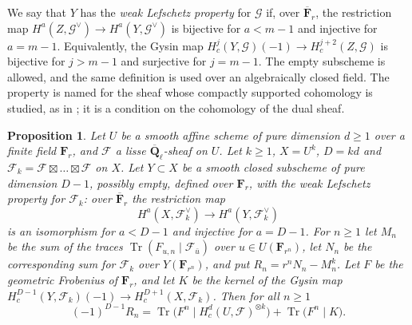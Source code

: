 \documentclass[11pt,a4paper]{article}
\theoremstyle{plain}
\newtheorem{proposition}[theorem]{Proposition}
\theoremstyle{remark}
\newcommand{\Ql}{\overline{\mathbf Q}_\ell}
\newcommand{\F}{\mathcal F}
\newcommand{\G}{\mathcal G}
\newcommand{\Tr}{\operatorname{Tr}}
\begin{document}
We say that $Y$ has the \emph{weak Lefschetz property} for $\G$ if, over $\overline{\mathbf F}_r$, the restriction
map $H^a(Z,\G^\vee)\to H^a(Y,\G^\vee)$ is bijective for $a<m-1$ and injective for $a=m-1$. Equivalently, the Gysin
map $H^j_c(Y,\G)(-1)\to H^{j+2}_c(Z,\G)$ is bijective for $j>m-1$ and surjective for $j=m-1$. The empty subscheme
is allowed, and the same definition is used over an algebraically closed field. The property is named for the
sheaf whose compactly supported cohomology is studied, as in \cite[Definition 2.3]{Zhang}; it is a condition on
the cohomology of the dual sheaf.

\begin{proposition}\label{prop:remainder}
Let $U$ be a smooth affine scheme of pure dimension $d\ge1$ over a finite field $\mathbf F_r$, and $\F$ a lisse
$\Ql$-sheaf on $U$. Let $k\ge1$, $X=U^k$, $D=kd$ and $\F_k=\F\boxtimes\dots\boxtimes\F$ on $X$. Let $Y\subset X$ be a
smooth closed subscheme of pure dimension $D-1$, possibly empty, defined over $\mathbf F_r$, with the weak Lefschetz
property for $\F_k$: over $\overline{\mathbf F}_r$ the restriction map
\[
H^a(X,\F_k^\vee)\longrightarrow H^a(Y,\F_k^\vee)
\]
is an isomorphism for $a<D-1$ and injective for $a=D-1$. For $n\ge1$ let $M_n$ be the sum of the traces
$\Tr(F_{u,n}\mid\F_{\bar u})$ over $u\in U(\mathbf F_{r^n})$, let $N_n$ be the corresponding sum for $\F_k$ over
$Y(\mathbf F_{r^n})$, and put $R_n=r^nN_n-M_n^k$. Let $F$ be the geometric Frobenius of $\mathbf F_r$, and let $K$ be
the kernel of the Gysin map $H^{D-1}_c(Y,\F_k)(-1)\to H^{D+1}_c(X,\F_k)$. Then for all $n\ge1$
\[
(-1)^{D-1}R_n=\Tr\bigl(F^n\mid H^d_c(U,\F)^{\otimes k}\bigr)+\Tr\bigl(F^n\mid K\bigr).
\]
\end{proposition}
\end{document}
